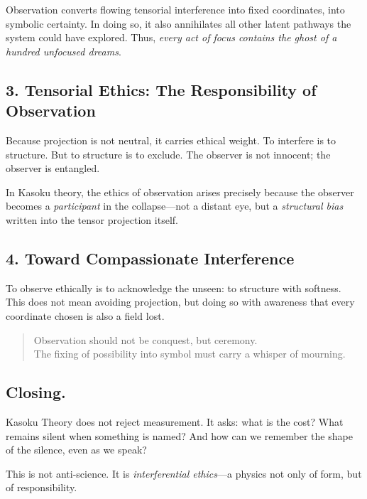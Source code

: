 Observation converts flowing tensorial interference into fixed coordinates, into symbolic certainty. In doing so, it also annihilates all other latent pathways the system could have explored. Thus, \textit{every act of focus contains the ghost of a hundred unfocused dreams}.

\subsection*{3. Tensorial Ethics: The Responsibility of Observation}
Because projection is not neutral, it carries ethical weight. To interfere is to structure. But to structure is to exclude. The observer is not innocent; the observer is entangled.

In Kasoku theory, the ethics of observation arises precisely because the observer becomes a \textit{participant} in the collapse—not a distant eye, but a \emph{structural bias} written into the tensor projection itself.

\subsection*{4. Toward Compassionate Interference}
To observe ethically is to acknowledge the unseen: to structure with softness. This does not mean avoiding projection, but doing so with awareness that every coordinate chosen is also a field lost.

\begin{quote}
    Observation should not be conquest, but ceremony. \\
    The fixing of possibility into symbol must carry a whisper of mourning.
\end{quote}

\subsection*{Closing.}
Kasoku Theory does not reject measurement. It asks: what is the cost? What remains silent when something is named? And how can we remember the shape of the silence, even as we speak?

This is not anti-science. It is \textit{interferential ethics}—a physics not only of form, but of responsibility.
